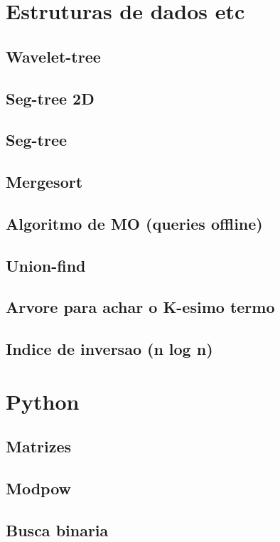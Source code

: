\section{Estruturas de dados etc}
\subsection{Wavelet-tree}
\raggedbottom
\hrulefill
\subsection{Seg-tree 2D}
\raggedbottom
\hrulefill
\subsection{Seg-tree}
\raggedbottom
\hrulefill
\subsection{Mergesort}
\raggedbottom
\hrulefill
\subsection{Algoritmo de MO (queries offline)}
\raggedbottom
\hrulefill
\subsection{Union-find}
\raggedbottom
\hrulefill
\subsection{Arvore para achar o K-esimo termo}
\raggedbottom
\hrulefill
\subsection{Indice de inversao (n log n)}
\raggedbottom
\hrulefill
\clearpage
\section{Python}
\subsection{Matrizes}
\raggedbottom
\hrulefill
\subsection{Modpow}
\raggedbottom
\hrulefill
\subsection{Busca binaria}
\raggedbottom
\hrulefill
\clearpage
